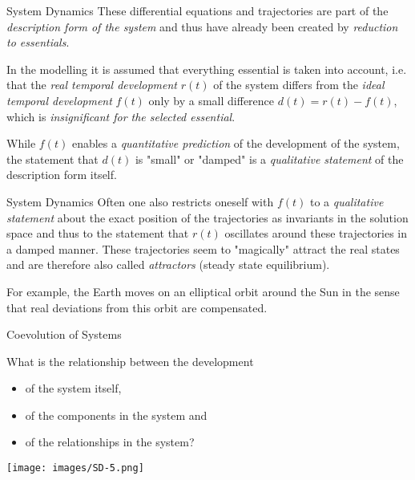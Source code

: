 \documentclass{beamer}
\begin{document}
\begin{frame}{System Dynamics}
These differential equations and trajectories are part of the
\emph{description form of the system} and thus have already been created by
\emph{reduction to essentials}.

In the modelling it is assumed that everything essential is taken into
account, i.e. that the \emph{real temporal development} $r(t)$ of the system
differs from the \emph{ideal temporal development} $f(t)$ only by a small
difference $d(t)=r(t)-f(t)$, which is \emph{insignificant for the selected
  essential}.

While $f(t)$ enables a \emph{quantitative prediction} of the development of
the system, the statement that $d(t)$ is "small" or "damped" is a
\emph{qualitative statement} of the description form itself.

\end{frame}

\begin{frame}{System Dynamics}
Often one also restricts oneself with $f(t)$ to a \emph{qualitative statement}
about the exact position of the trajectories as invariants in the solution
space and thus to the statement that $r(t)$ oscillates around these
trajectories in a damped manner.  These trajectories seem to "magically"
attract the real states and are therefore also called \emph{attractors}
(steady state equilibrium).

For example, the Earth moves on an elliptical orbit around the Sun in the
sense that real deviations from this orbit are compensated.

\end{frame}

\begin{frame}{Coevolution of Systems}
\begin{minipage}{.55\textwidth}
  What is the relationship between the development
  \begin{itemize}
  \item of the system itself,
  \item of the components in the system and
  \item of the relationships in the system?
  \end{itemize}
\end{minipage}\hfill 
\begin{minipage}{.4\textwidth}
    \begin{center}
      \texttt{[image: images/SD-5.png]}
    \end{center}
  \end{minipage}
\end{frame}
\end{document}
